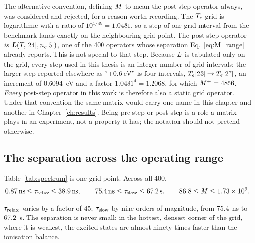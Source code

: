 The alternative convention, defining $M$ to mean the post-step operator
always, was considered and rejected, for a reason worth recording. The
$T_e$ grid is logarithmic with a ratio of $10^{1/49} = 1.0481$, so a step of one
grid interval from the benchmark lands exactly on the neighbouring grid point.
The post-step operator \emph{is} $\bm{L}(T_e[24],n_e[5])$, one of the 400
operators whose separation Eq.~\eqref{eq:M_range} already reports. This is not
special to that step. Because $\bm{L}$ is tabulated only on the grid, every step
used in this thesis is an integer number of grid intervals: the larger step
reported elsewhere as \enquote{$+\SI{0.6}{\electronvolt}$} is four intervals,
$T_e[23] \to T_e[27]$, an increment of \SI{0.6094}{\electronvolt} and a factor
$1.0481^4 = 1.2068$, for which $M^+ = 4856$. \emph{Every} post-step operator
in this work is therefore also a static grid operator. Under that
convention the same matrix would carry one name in this chapter and another in
Chapter~\ref{ch:results}. Being pre-step or post-step is a role a matrix plays
in an experiment, not a property it has; the notation should not pretend
otherwise.

\subsection{The separation across the operating range}

Table~\ref{tab:spectrum} is one grid point. Across all 400,
\begin{equation}
  \SI{0.87}{\nano\second} \le \tau_{\mathrm{relax}} \le \SI{38.9}{\nano\second},
  \qquad
  \SI{75.4}{\nano\second} \le \tau_{\mathrm{slow}} \le \SI{67.2}{\second},
  \qquad
  86.8 \le M \le 1.73\times10^{9}.
  \label{eq:M_range}
\end{equation}

\noindent $\tau_{\mathrm{relax}}$ varies by a factor of 45; $\tau_{\mathrm{slow}}$ by nine orders of
magnitude, from \SI{75.4}{\nano\second} to \SI{67.2}{\second}. The separation is never small: in the hottest, densest corner of the
grid, where it is weakest, the excited states are almost ninety times faster
than the ionisation balance.

